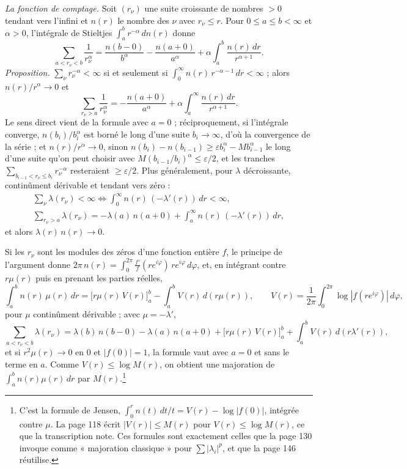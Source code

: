 \documentclass[11pt,a4paper]{article}
\begin{document}
\emph{La fonction de comptage.} Soit $(r_\nu)$ une suite croissante de
nombres $> 0$ tendant vers l'infini et $n(r)$ le nombre des $\nu$ avec
$r_\nu \leq r$. Pour $0 \leq a \leq b < \infty$ et $\alpha > 0$, l'intégrale
de Stieltjes $\int_a^b r^{-\alpha}\,dn(r)$ donne
\[
  \sum_{a < r_\nu < b} \frac{1}{r_\nu^\alpha}
  = \frac{n(b-0)}{b^\alpha} - \frac{n(a+0)}{a^\alpha}
  + \alpha\int_a^b \frac{n(r)\,dr}{r^{\alpha+1}} .
\]
\emph{Proposition.} $\sum_\nu r_\nu^{-\alpha} < \infty$ si et seulement si
$\int_0^\infty n(r)\,r^{-\alpha-1}\,dr < \infty$ ; alors $n(r)/r^\alpha \to 0$
et
\[
  \sum_{r_\nu > a} \frac{1}{r_\nu^\alpha} = -\frac{n(a+0)}{a^\alpha}
  + \alpha\int_a^\infty \frac{n(r)\,dr}{r^{\alpha+1}} .
\]
Le sens direct vient de la formule avec $a = 0$ ; réciproquement, si
l'intégrale converge, $n(b_i)/b_i^\alpha$ est borné le long d'une suite
$b_i \to \infty$, d'où la convergence de la série ; et $n(r)/r^\alpha \to 0$,
sinon $n(b_i) - n(b_{i-1}) \geq \varepsilon b_i^\alpha - M b_{i-1}^\alpha$ le
long d'une suite qu'on peut choisir avec $M(b_{i-1}/b_i)^\alpha \leq
\varepsilon/2$, et les tranches $\sum_{b_{i-1} < r_\nu \leq b_i}
r_\nu^{-\alpha}$ resteraient $\geq \varepsilon/2$. Plus généralement, pour
$\lambda$ décroissante, continûment dérivable et tendant vers zéro :
\begin{gather*}
  \sum_\nu \lambda(r_\nu) < \infty \iff \int_0^\infty n(r)\,(-\lambda'(r))\,dr < \infty, \\
  \sum_{r_\nu > a} \lambda(r_\nu) = -\lambda(a)\,n(a+0) + \int_a^\infty n(r)\,(-\lambda'(r))\,dr,
\end{gather*}
et alors $\lambda(r)\,n(r) \to 0$.

Si les $r_\nu$ sont les modules des zéros d'une fonction entière $f$, le
principe de l'argument donne $2\pi\,n(r) = \int_0^{2\pi} \frac{f'}{f}(re^{i\varphi})\,
re^{i\varphi}\,d\varphi$, et, en intégrant contre $r\mu(r)$ puis en prenant
les parties réelles,
\[
  \int_a^b n(r)\,\mu(r)\,dr = \bigl[r\mu(r)\,V(r)\bigr]_a^b - \int_a^b V(r)\,d(r\mu(r)),
  \qquad V(r) = \frac{1}{2\pi}\int_0^{2\pi} \log|f(re^{i\varphi})|\,d\varphi,
\]
pour $\mu$ continûment dérivable ; avec $\mu = -\lambda'$,
\[
  \sum_{a < r_\nu < b} \lambda(r_\nu) = \lambda(b)\,n(b-0) - \lambda(a)\,n(a+0)
  + \bigl[r\mu(r)\,V(r)\bigr]_a^b + \int_a^b V(r)\,d(r\lambda'(r)),
\]
et si $r^2\mu(r) \to 0$ en $0$ et $|f(0)| = 1$, la formule vaut avec $a = 0$
et sans le terme en $a$. Comme $V(r) \leq \log M(r)$, on obtient une
majoration de $\int_a^b n(r)\mu(r)\,dr$ par $M(r)$.\footnote{C'est la
formule de Jensen, $\int_0^r n(t)\,dt/t = V(r) - \log|f(0)|$, intégrée
contre $\mu$. La page 118 écrit $|V(r)| \leq M(r)$ pour $V(r) \leq \log
M(r)$, ce que la transcription note. Ces formules sont exactement celles
que la page 130 invoque comme « majoration classique » pour $\sum
|\lambda_i|^p$, et que la page 146 réutilise.}
\end{document}
